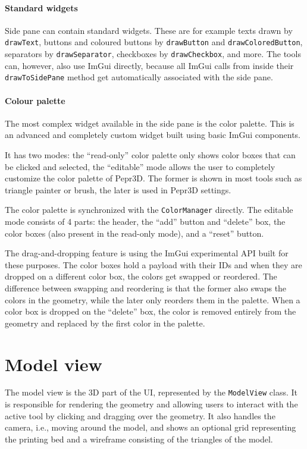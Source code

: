 \paragraph{Standard widgets}
Side pane can contain standard widgets.
These are for example texts drawn by \texttt{drawText}, buttons and coloured buttons by \texttt{drawButton} and \texttt{drawColoredButton}, separators by \texttt{drawSeparator}, checkboxes by \texttt{drawCheckbox}, and more.
The tools can, however, also use ImGui directly, because all ImGui calls from inside their \texttt{drawToSidePane} method get automatically associated with the side pane.

\paragraph{Colour palette}
The most complex widget available in the side pane is the color palette.
This is an advanced and completely custom widget built using basic ImGui components.

It has two modes: the ``read-only'' color palette only shows color boxes that can be clicked and selected, the ``editable'' mode allows the user to completely customize the color palette of Pepr3D.
The former is shown in most tools such as triangle painter or brush, the later is used in Pepr3D settings.

The color palette is synchronized with the \texttt{ColorManager} directly.
The editable mode consists of 4 parts: the header, the ``add'' button and ``delete'' box, the color boxes (also present in the read-only mode), and a ``reset'' button.

The drag-and-dropping feature is using the ImGui experimental API built for these purposes.
The color boxes hold a payload with their IDs and when they are dropped on a different color box, the colors get swapped or reordered.
The difference between swapping and reordering is that the former also swaps the colors in the geometry, while the later only reorders them in the palette.
When a color box is dropped on the ``delete'' box, the color is removed entirely from the geometry and replaced by the first color in the palette.

\section{Model view}

The model view is the 3D part of the UI, represented by the \texttt{ModelView} class.
It is responsible for rendering the geometry and allowing users to interact with the active tool by clicking and dragging over the geometry.
It also handles the camera, i.e., moving around the model, and shows an optional grid representing the printing bed and a wireframe consisting of the triangles of the model.

